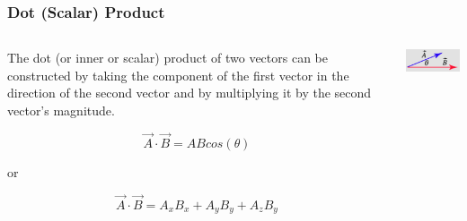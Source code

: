 \documentclass{beamer}
\begin{document}
\begin{frame}\frametitle{Dot (Scalar) Product}
\begin{columns}
\begin{column}{6cm}
The dot (or inner or scalar) product of two vectors can be constructed by taking the component of the first vector in the direction  of the second vector and by multiplying it by the second vector's magnitude.

\begin{equation}
\vec{A} \cdot \vec{B} = AB cos(\theta)
\end{equation}

or

\begin{equation}
\vec{A} \cdot \vec{B} = A_x B_x + A_y B_y + A_z B_y
\end{equation}
\end{column}
\begin{column}{5cm}

\begin{center}
\includegraphics[width=4.8cm]{fig/vecdot.jpg}
\end{center}
\end{column}
\end{columns}
\end{frame}
\end{document}
